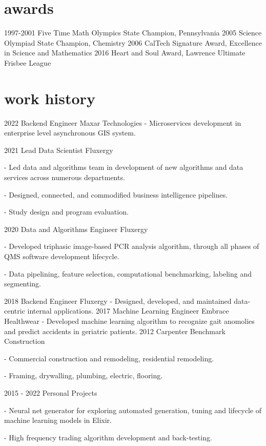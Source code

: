 \documentclass[]{twentysecondcv}
\begin{document}

\section{awards}

\begin{twentyshort}
  \twentyitemshort
    {1997-2001}
	{Five Time Math Olympics State Champion, Pennsylvania}
  \twentyitemshort
    {2005}
    {Science Olympiad State Champion, Chemistry}
  \twentyitemshort
    {2006}
    {CalTech Signature Award, Excellence in Science and Mathematics}
  \twentyitemshort
    {2016}
    {Heart and Soul Award, Lawrence Ultimate Frisbee League}
\end{twentyshort}


\section{work history}

\begin{twenty}
  \twentyitem
    {2022}
    {Backend Engineer}
    {Maxar Technologies}
    {- Microservices development in enterprise level asynchronous GIS system. 
}

  \twentyitem
    {2021}
    {Lead Data Scientist}
    {Fluxergy}
    {- Led data and algorithms team in development of new algorithms and data services across numerous departments.

	- Designed, connected, and commodified business intelligence pipelines.

	- Study design and program evaluation.
	} 
  \twentyitem
    {2020}
    {Data and Algorithms Engineer}
    {Fluxergy}
    {- Developed triphasic image-based PCR analysis algorithm, through all phases of QMS software development lifecycle.

    - Data pipelining, feature selection, computational benchmarking, labeling and segmenting.

	} 
  \twentyitem
    {2018}
    {Backend Engineer}
    {Fluxergy}
    {- Designed, developed, and maintained data-centric internal applications.
	} 
  \twentyitem
    {2017}
    {Machine Learning Engineer}
    {Embrace Healthwear}
    {- Developed machine learning algorithm to recognize gait anomolies and predict accidents in geriatric patients.
	} 
  \twentyitem
    {2012}
    {Carpenter}
    {Benchmark Construction}
    {- Commercial construction and remodeling, residential remodeling.

	- Framing, drywalling, plumbing, electric, flooring.
	} 
  \twentyitem
    {2015 - 2022}
    {Personal Projects}
    {}
    {- Neural net generator for exploring automated generation, tuning and lifecycle of machine learning models in Elixir.

	- High frequency trading algorithm development and back-testing.} 
\end{twenty}
\end{document}
